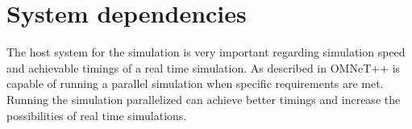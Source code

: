 \documentclass[journal]{IEEEtran}
\begin{document}
\section{System dependencies}
\label{sec:SystemDependencies}
The host system for the simulation is very important regarding simulation speed and achievable timings of a real time simulation.
As described in \cite{Sekercioglu2003} OMNeT++ is capable of running a parallel simulation when specific requirements are met.
Running the simulation parallelized can achieve better timings and increase the possibilities of real time simulations.



%
%



%
%
\end{document}
